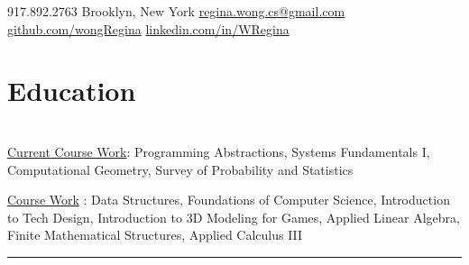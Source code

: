 \documentclass[]{deedy-resume-openfont}
\begin{document}
%
%
\lastupdated

%
%

{ \faMobilePhone \hspace{0.1 in} 917.892.2763}
{ \faMapMarker \hspace{0.1 in}Brooklyn, New York}
{\href{mailto:regina.wong.cs@gmail.com}{ \faEnvelopeSquare \hspace{0.1 in} regina.wong.cs@gmail.com}}
{ \href{https://github.com/wongRegina}{\faGithubSquare\hspace{0.1 in} github.com/wongRegina}}
{\href{https://www.linkedin.com/in/wregina}{ \faLinkedinSquare \hspace{0.1 in} linkedin.com/in/WRegina}}
\section{Education}

\\

\hspace{0.1 in} \underline{{Current Course Work}}: Programming Abstractions, Systems Fundamentals I, Computational Geometry, Survey of Probability and Statistics

\hspace{0.1 in} \underline{{Course Work}} :  Data Structures, Foundations of Computer Science, Introduction to Tech Design, Introduction to 3D Modeling for Games, Applied Linear Algebra, Finite Mathematical Structures, Applied Calculus III
\sectionsep

\noindent\rule{\textwidth}{0.4pt}
\end{document}
